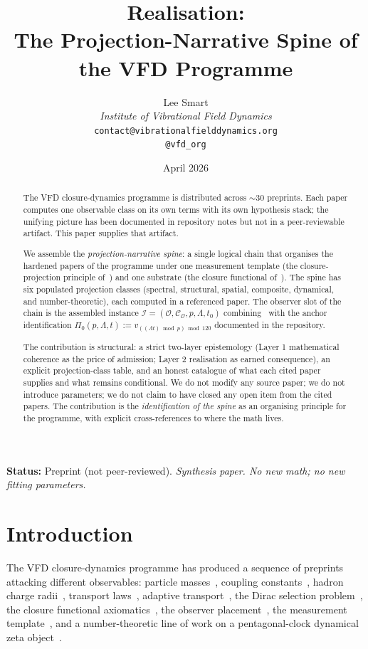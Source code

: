 \documentclass[12pt]{article}
\title{Realisation:\\[6pt]
\large The Projection-Narrative Spine of the VFD Programme}
\author{%
  Lee Smart\\[4pt]
  \textit{Institute of Vibrational Field Dynamics}\\[2pt]
  \texttt{contact@vibrationalfielddynamics.org}\\[2pt]
  \texttt{@vfd\_org}%
}
\date{April 2026}
\newcommand{\Ocal}{\mathcal{O}}
\newcommand{\Ical}{\mathcal{I}}
\newcommand{\Ccal}{\mathcal{C}}
\begin{document}
\maketitle

\noindent\textbf{Status:} Preprint (not peer-reviewed). \emph{Synthesis paper. No new math; no new fitting parameters.}

\begin{abstract}
The VFD closure-dynamics programme is distributed across $\sim 30$ preprints. Each paper computes one observable class on its own terms with its own hypothesis stack; the unifying picture has been documented in repository notes but not in a peer-reviewable artifact. This paper supplies that artifact.

We assemble the \emph{projection-narrative spine}: a single logical chain that organises the hardened papers of the programme under one measurement template (the closure-projection principle of~\citep{SmartXXXIII}) and one substrate (the closure functional of~\citep{SmartXXXVI}). The spine has six populated projection classes (spectral, structural, spatial, composite, dynamical, and number-theoretic), each computed in a referenced paper. The observer slot of the chain is the assembled instance $\Ical = (\Ocal, \Ccal_\Ocal, p, \Lambda, t_0)$ combining~\citep{SmartXXIX} with the anchor identification $\Pi_0(p, \Lambda, t) := v_{((\Lambda t) \bmod p) \bmod 120}$ documented in the repository.

The contribution is structural: a strict two-layer epistemology (Layer 1 mathematical coherence as the price of admission; Layer 2 realisation as earned consequence), an explicit projection-class table, and an honest catalogue of what each cited paper supplies and what remains conditional. We do not modify any source paper; we do not introduce parameters; we do not claim to have closed any open item from the cited papers. The contribution is the \emph{identification of the spine} as an organising principle for the programme, with explicit cross-references to where the math lives.
\end{abstract}

\section{Introduction}\label{sec:intro}

The VFD closure-dynamics programme has produced a sequence of preprints attacking different observables: particle masses~\citep{SmartV}, coupling constants~\citep{SmartXXII}, hadron charge radii~\citep{SmartXXXII}, transport laws~\citep{SmartTransportLaw}, adaptive transport~\citep{SmartACT}, the Dirac selection problem~\citep{SmartBridge}, the closure functional axiomatics~\citep{SmartXXXVI}, the observer placement~\citep{SmartXXIX}, the measurement template~\citep{SmartXXXIII}, and a number-theoretic line of work on a pentagonal-clock dynamical zeta object~\citep{SmartRHFormal}.
\end{document}

